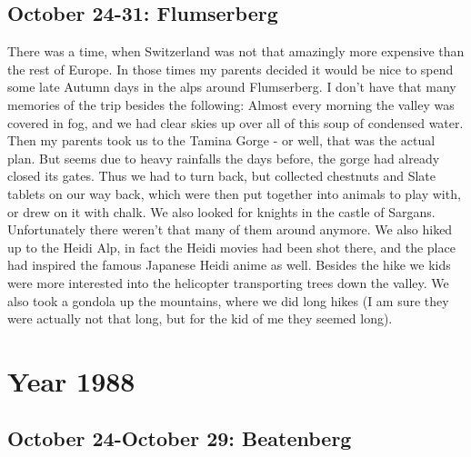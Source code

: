 \section{October 24-31: Flumserberg}
\label{1987:Flums}

There was a time, when Switzerland was not that amazingly more expensive than the rest of Europe. In those times my parents decided it would be nice to spend some late Autumn days in the alps around Flumserberg. I don't have that many memories of the trip besides the following: Almost every morning the valley was covered in fog, and we had clear skies up over all of this soup of condensed water. Then my parents took us to the Tamina Gorge - or well, that was the actual plan. But seems due to heavy rainfalls the days before, the gorge had already closed its gates. Thus we had to turn back, but collected chestnuts and Slate tablets on our way back, which were then put together into animals to play with, or drew on it with chalk. We also looked for knights in the castle of Sargans. Unfortunately there weren't that many of them around anymore. We also hiked up to the Heidi Alp, in fact the Heidi movies had been shot there, and the place had inspired the famous Japanese Heidi anime as well. Besides the hike we kids were more interested into the helicopter transporting trees down the valley. We also took a gondola up the mountains, where we did long hikes (I am sure they were actually not that long, but for the kid of me they seemed long). 

\chapter{Year 1988}
\label{1988}


\section{October 24-October 29: Beatenberg}
\label{1988:Beatenberg}

